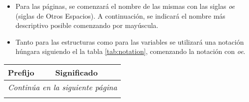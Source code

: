 \begin{itemize}[-]
  \item Para las páginas, se comenzará el nombre de las mismas con las siglas \textit{oe} (siglas de Otros Espacios). A continuación, se indicará el nombre más descriptivo posible comenzando por mayúscula.
  \item Tanto para las estructuras como para las variables se utilizará una notación húngara siguiendo el la tabla \ref{tab:notation}, comenzando la notación con \textit{oe}.
\end{itemize}

\begin{center}
\begin{longtable}{p{2cm} p{10cm}}

Prefijo &	Significado \\ \hline \hline
\endfirsthead
\endhead

\hline \multicolumn{2}{r}{\textit{Continúa en la siguiente página}} \\
\endfoot
\endlastfoot


\end{longtable}
\end{center}
